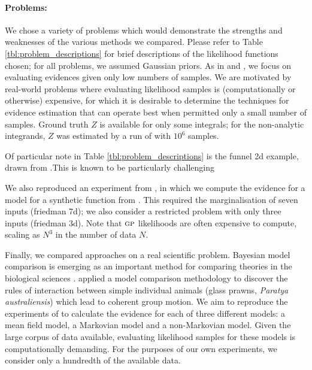 \documentclass{article}
\begin{document}
\paragraph{Problems:}
We chose a variety of problems which would demonstrate the strengths and weaknesses of the various methods we compared. Please refer to Table \ref{tbl:problem_descriptions} for brief descriptions of the likelihood functions chosen; for all problems, we assumed Gaussian priors. As in \citet{BZMonteCarlo} and \citet{BQR}, we focus on evaluating evidences given only low numbers of samples. We are motivated by real-world problems where evaluating likelihood samples is (computationally or otherwise) expensive, for which it is desirable to determine the techniques for evidence estimation that can operate best when permitted only a small number of samples. Ground truth $Z$ is available for only some integrals; for the non-analytic integrands, $Z$ was estimated by a run of  with $10^6$ samples.



Of particular note in Table \ref{tbl:problem_descriptions} is the funnel 2d example, drawn from \citet{NealMC}.This is known to be particularly challenging

We also reproduced an experiment from \citet{BZMonteCarlo}, in which we compute the evidence for a \gpb model for a synthetic function from \citet{friedman1991}. This required the marginalisation of seven inputs (friedman 7d); we also consider a restricted problem with only three inputs (friedman 3d). Note that $\gpb$ likelihoods are often expensive to compute, scaling as $N^3$ in the number of data $N$.

Finally, we compared approaches on a real scientific problem. Bayesian model comparison is emerging as an important method for comparing theories in the biological sciences 
\citep{penny2010comparing, mann2011bayesian, mann2011objectively, rosa2011bayesian}. \citet{mann2012multi} applied a model comparison methodology to discover the rules of interaction between simple individual animals (glass prawns, {\it Paratya australiensis}) which lead to coherent group motion. We aim to reproduce the experiments of \citep{mann2012multi} to calculate the evidence for each of three different models: a mean field model, a Markovian model and a non-Markovian model. Given the large corpus of data available, evaluating likelihood samples for these models is computationally demanding. For the purposes of our own experiments, we consider only a hundredth of the available data.
\end{document}
